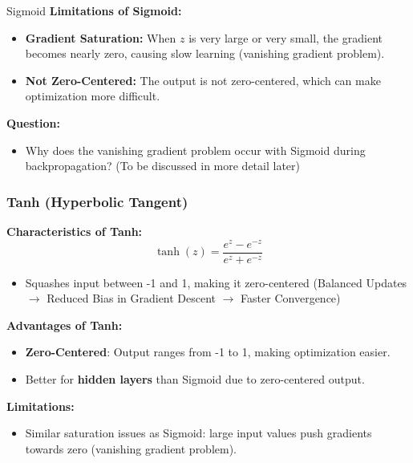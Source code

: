 \documentclass[serif, aspectratio=169]{beamer}
\begin{document}
\begin{frame}{Sigmoid}
    \textbf{Limitations of Sigmoid:}
    \begin{itemize}
        \item \textbf{Gradient Saturation:} When \( z \) is very large or very small, the gradient becomes nearly zero, causing slow learning (vanishing gradient problem).
        \item \textbf{Not Zero-Centered:} The output is not zero-centered, which can make optimization more difficult.
    \end{itemize}

    \textbf{Question:}
    \begin{itemize}
        \item Why does the vanishing gradient problem occur with Sigmoid during backpropagation? (To be discussed in more detail later)
    \end{itemize}
\end{frame}

\begin{frame}
    \frametitle{Tanh (Hyperbolic Tangent)}

    \textbf{Characteristics of Tanh:}
    \begin{equation*}
        \tanh(z) = \frac{e^z - e^{-z}}{e^z + e^{-z}}
    \end{equation*}
    \begin{itemize}
        \item Squashes input between -1 and 1, making it zero-centered (Balanced Updates $\rightarrow$ Reduced Bias in Gradient Descent $\rightarrow$ Faster Convergence)
    \end{itemize}

    \textbf{Advantages of Tanh:}
    \begin{itemize}
        \item \textbf{Zero-Centered}: Output ranges from -1 to 1, making optimization easier.
        \item Better for \textbf{hidden layers} than Sigmoid due to zero-centered output.
    \end{itemize}

    \textbf{Limitations:}
    \begin{itemize}
        \item Similar saturation issues as Sigmoid: large input values push gradients towards zero (vanishing gradient problem).
    \end{itemize}

\end{frame}
\end{document}
